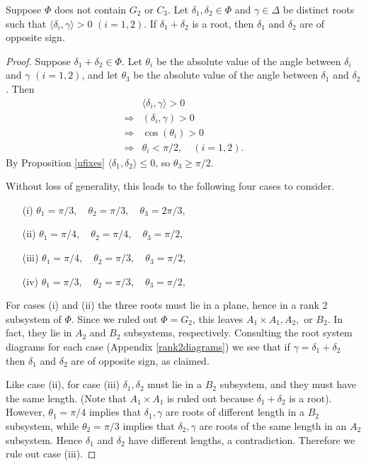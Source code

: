 \begin{proposition} \label{uabelian}
Suppose $\Phi$ does not contain $G_2$ or $C_3$. Let $\delta_1, \delta_2 \in \Phi$ and $\gamma \in \Delta$ be distinct roots such that $\langle \delta_i, \gamma \rangle > 0$ $(i = 1, 2)$. If $\delta_1 + \delta_2$ is a root, then $\delta_1$ and $\delta_2$ are of opposite sign.
\end{proposition}
\begin{proof}
Suppose $\delta_1 + \delta_2 \in \Phi$. Let $\theta_i$ be the absolute value of the angle between $\delta_i$ and $\gamma$ $(i = 1,2)$, and let $\theta_3$ be the absolute value of the angle between $\delta_1$ and $\delta_2$. Then
\begin{align*}
&\langle \delta_i, \gamma\rangle > 0 \\
\Rightarrow &(\delta_i, \gamma) > 0 \\
\Rightarrow &\cos(\theta_i) > 0 \\
\Rightarrow &\theta_i < \pi/2,\quad (i = 1,2).
\end{align*}
By Proposition \ref{ufixes} $\langle \delta_1, \delta_2 \rangle \leq 0$, so $\theta_3 \geq \pi/2$.

Without loss of generality, this leads to the following four cases to consider.
\begin{itemize}
\item[(i)]$\theta_1 = \pi/3,\quad\theta_2 = \pi/3,\quad\theta_3 = 2\pi/3$,
\item[(ii)]$\theta_1 = \pi/4,\quad\theta_2 = \pi/4,\quad\theta_3 = \pi/2$,
\item[(iii)]$\theta_1 = \pi/4,\quad\theta_2 = \pi/3,\quad\theta_3 = \pi/2$,
\item[(iv)]$\theta_1 = \pi/3,\quad\theta_2 = \pi/3,\quad\theta_3 = \pi/2$,
\end{itemize}

For cases (i) and (ii) the three roots must lie in a plane, hence in a rank 2 subsystem of $\Phi$. Since we ruled out $\Phi=G_2$, this leaves $A_1 \times A_1, A_2,$ or $B_2$. In fact, they lie in $A_2$ and $B_2$ subsystems, respectively. Consulting the root system diagrams for each case (Appendix \ref{rank2diagrams}) we see that if $\gamma = \delta_1 + \delta_2$ then $\delta_1$ and $\delta_2$ are of opposite sign, as claimed.

Like case (ii), for case (iii) $\delta_1, \delta_2$ must lie in a $B_2$ subsystem, and they must have the same length. (Note that $A_1\times A_1$ is ruled out because $\delta_1+\delta_2$ is a root). However, $\theta_1 = \pi/4$ implies that $\delta_1, \gamma$ are roots of different length in a $B_2$ subsystem, while $\theta_2 = \pi/3$ implies that $\delta_2, \gamma$ are roots of the same length in an $A_2$ subsystem. Hence $\delta_1$ and $\delta_2$ have different lengths, a contradiction. Therefore we rule out case (iii).


\end{proof}
